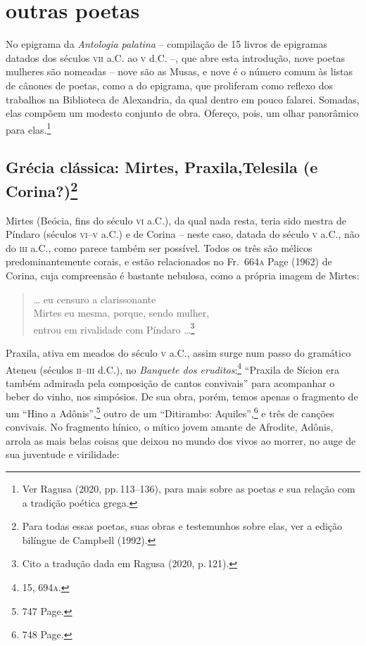 \section*{outras poetas}

No epigrama da \textit{Antologia palatina} -- compilação de 15 livros de
epigramas datados dos séculos \textsc{vii} a.C. ao \textsc{v} d.C. --, que abre esta introdução,
nove poetas mulheres são nomeadas -- nove são as Musas, e nove é o número comum
às listas de cânones de poetas, como a do epigrama, que proliferam como reflexo
dos trabalhos na Biblioteca de Alexandria, da qual dentro em pouco falarei.
Somadas, elas compõem um modesto conjunto de obra.
Ofereço, pois, um olhar panorâmico para elas.\footnote{Ver Ragusa (2020, pp.\,113--136), para mais sobre as poetas e sua relação com a tradição poética grega.}

\subsection*{Grécia clássica: Mirtes, Praxila,\break Telesila (e
Corina?)\protect\footnote{\MakeUppercase{P}ara todas essas poetas, suas obras e testemunhos sobre elas, ver a edição bilíngue de \MakeUppercase{C}ampbell (1992).}}

Mirtes (Beócia, fins do século \textsc{vi} a.C.), da qual nada resta, teria sido mestra
de Píndaro (séculos \textsc{vi}--\textsc{v} a.C.) e de Corina -- neste caso, datada do século \textsc{v}
a.C., não do \textsc{iii} a.C., como parece também ser possível. Todos os três são
mélicos predominantemente corais, e estão relacionados no Fr.~664\textsc{a}
Page (1962) de Corina, cuja compreensão
é bastante nebulosa, como a própria imagem de Mirtes:


\begin{verse}
\small{\ldots{} eu censuro a clarissonante\\
Mirtes eu mesma, porque, sendo mulher,\\
entrou em rivalidade com Píndaro \ldots{}}\footnote{Cito a tradução dada em Ragusa (2020, p.\,121).}
\end{verse}

Praxila, ativa em meados do século \textsc{v} a.C., assim surge num passo do gramático
Ateneu (séculos \textsc{ii}--\textsc{iii} d.C.), no \textit{Banquete dos eruditos}:\footnote{15, 694\textsc{a}.}
``Praxila de Sícion era também admirada pela composição de cantos
convivais” para acompanhar o beber do vinho, nos simpósios. De sua obra,
porém, temos apenas o fragmento de um “Hino a Adônis”,\footnote{747 Page.} outro
de um “Ditirambo: Aquiles”,\footnote{748 Page.} e três de canções convivais. No fragmento
hínico, o mítico jovem amante de Afrodite, Adônis, arrola as mais belas coisas
que deixou no mundo dos vivos ao morrer, no auge de sua juventude e virilidade:

